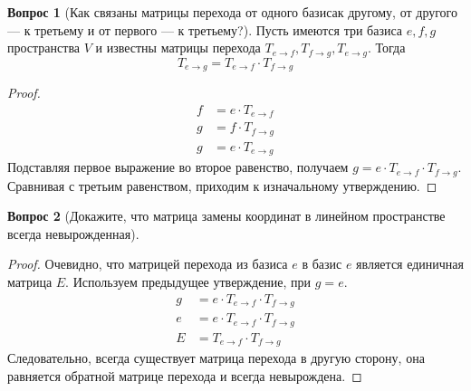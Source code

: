 \documentclass[a4paper,11pt]{article}
\theoremstyle{remark}
\theoremstyle{definition}
\newtheorem{question}{Вопрос}
\numberwithin{question}{subsection}
\begin{document}
\begin{question}[Как связаны матрицы перехода от одного базисак другому, от другого --- к третьему и от первого --- к третьему?]
Пусть имеются три базиса \(e, f, g\) пространства \(V\) и известны матрицы перехода \(T_{e \rightarrow f}, T_{f \rightarrow g}, T_{e \rightarrow g}\). Тогда
\begin{equation*}
	T_{e \rightarrow g} = T_{e \rightarrow f} \cdot T_{f \rightarrow g}
\end{equation*}

\begin{proof}
\begin{align*}
	f &= e \cdot T_{e \rightarrow f} \\
	g &= f \cdot T_{f \rightarrow g} \\
	g &= e \cdot T_{e \rightarrow g}
\end{align*}
Подставляя первое выражение во второе равенство, получаем \(g = e \cdot T_{e \rightarrow f} \cdot T_{f \rightarrow g}\). Сравнивая с третьим равенством, приходим к изначальному утверждению.
\end{proof}
\end{question}


\begin{question}[Докажите, что матрица замены координат в линейном пространстве всегда невырожденная]\(\)
\begin{proof}
Очевидно, что матрицей перехода из базиса \(e\) в базис \(e\) является единичная матрица \(E\). Используем предыдущее утверждение, при \(g = e\).
\begin{align*}
	g &= e \cdot T_{e \rightarrow f} \cdot T_{f \rightarrow g} \\
	e &= e \cdot T_{e \rightarrow f} \cdot T_{f \rightarrow g} \\
	E &= T_{e \rightarrow f} \cdot T_{f \rightarrow g}
\end{align*}
Следовательно, всегда существует матрица перехода в другую сторону, она равняется обратной матрице перехода и всегда невырождена.
\end{proof}
\end{question}
\end{document}
